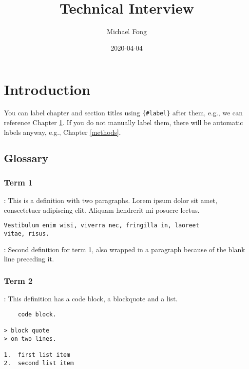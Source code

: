 \documentclass[]{book}
\title{Technical Interview}
\author{Michael Fong}
\date{2020-04-04}
\begin{document}
\maketitle


{
\setcounter{tocdepth}{1}
\tableofcontents
}
\hypertarget{intro}{%
\chapter{Introduction}\label{intro}}

You can label chapter and section titles using \texttt{\{\#label\}} after them, e.g., we can reference Chapter \ref{intro}. If you do not manually label them, there will be automatic labels anyway, e.g., Chapter \ref{methods}.

\hypertarget{glossary}{%
\section{Glossary}\label{glossary}}

\hypertarget{term1}{%
\subsection{Term 1}\label{term1}}

: This is a definition with two paragraphs. Lorem ipsum
dolor sit amet, consectetuer adipiscing elit. Aliquam
hendrerit mi posuere lectus.

\begin{verbatim}
Vestibulum enim wisi, viverra nec, fringilla in, laoreet
vitae, risus.
\end{verbatim}

: Second definition for term 1, also wrapped in a paragraph
because of the blank line preceding it.

\hypertarget{term2}{%
\subsection{Term 2}\label{term2}}

: This definition has a code block, a blockquote and a list.

\begin{verbatim}
    code block.

> block quote
> on two lines.

1.  first list item
2.  second list item
\end{verbatim}
\end{document}
